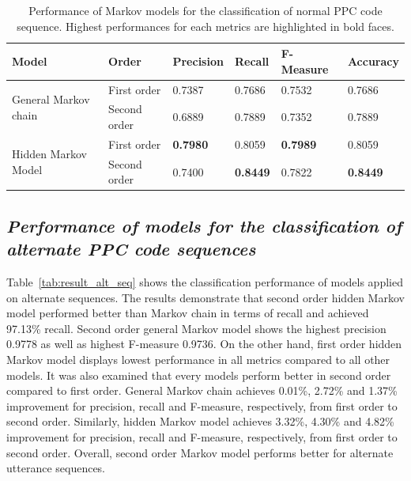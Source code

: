 \documentclass{amia}
\begin{document}
\begin{table}[h]
\centering
\caption{Performance of Markov models for the classification of normal PPC code sequence. Highest performances for each metrics are highlighted in bold faces.}
\label{tab:result_norm_seq}
  \begin{tabular}{|l|l|l|l|l|l|}
  \hline
   \textbf{Model} & \textbf{Order}  & \textbf{Precision}  & \textbf{Recall} & \textbf{F-Measure} & \textbf{Accuracy}\\ \hline    
    
 \multirow{2}{*}{General Markov chain} & First order & 0.7387 & 0.7686 & 0.7532 & 0.7686\\\cline{2-6}
 & Second order & 0.6889 & 0.7889 & 0.7352 & 0.7889\\ \hline
 \multirow{2}{*}{Hidden Markov Model} & First order & \textbf{0.7980} & 0.8059 & \textbf{0.7989} & 0.8059\\ \cline{2-6}
 & Second order & 0.7400 & \textbf{0.8449} & 0.7822  & \textbf{0.8449}\\ \hline
 
  \end{tabular}
\end{table} 

\subsection*{\textit{Performance of models for the classification of alternate PPC code sequences}}
Table~\ref{tab:result_alt_seq} shows the classification performance of models applied on alternate sequences. The results demonstrate that second order hidden Markov model performed better than Markov chain in terms of recall and achieved 97.13\% recall. Second order general Markov model shows the highest precision 0.9778 as well as highest F-measure 0.9736. On the other hand, first order hidden Markov model displays lowest performance in all metrics compared to all other models. It was also examined that every models perform better in second order compared to first order. General Markov chain achieves 0.01\%, 2.72\% and 1.37\% improvement for precision, recall and F-measure, respectively, from first order to second order. Similarly, hidden Markov model achieves 3.32\%, 4.30\% and 4.82\% improvement for precision, recall and F-measure, respectively, from first order to second order. Overall, second order Markov model performs better for alternate utterance sequences. \\
\end{document}
